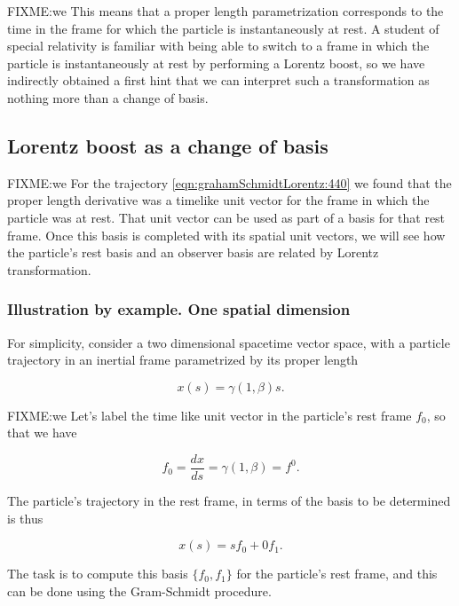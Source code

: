 FIXME:we
This means that a proper length parametrization corresponds to the time in the frame for which the particle is instantaneously at rest.  A student of special relativity is familiar with being able to switch to a frame in which the particle is instantaneously at rest by performing a Lorentz boost, so we have indirectly obtained a first hint that we can interpret such a transformation as nothing more than a change of basis.

\subsection{Lorentz boost as a change of basis}

FIXME:we
For the trajectory \ref{eqn:grahamSchmidtLorentz:440} we found that the proper length derivative was a timelike unit vector for the frame in which the particle was at rest.  That unit vector can be used as part of a basis for that rest frame.  Once this basis is completed with its spatial unit vectors, we will see how the particle's rest basis and an observer basis are related by Lorentz transformation.

\subsubsection{Illustration by example.  One spatial dimension}

For simplicity, consider a two dimensional spacetime vector space, with a particle trajectory in an inertial frame parametrized by its proper length

\begin{equation}\label{eqn:grahamSchmidtLorentz:600}
x(s) = \gamma (1, \beta) s.
\end{equation}

FIXME:we
Let's label the time like unit vector in the particle's rest frame $f_0$, so that we have

\begin{equation}\label{eqn:grahamSchmidtLorentz:620}
f_0 = \frac{dx}{ds} = \gamma (1, \beta) = f^0.
\end{equation}

The particle's trajectory in the rest frame, in terms of the basis to be determined is thus

\begin{equation}\label{eqn:grahamSchmidtLorentz:640}
x(s) = s f_0 + 0 f_1.
\end{equation}

The task is to compute this basis $\{f_0, f_1\}$ for the particle's rest frame, and this can be done using the Gram-Schmidt procedure.

